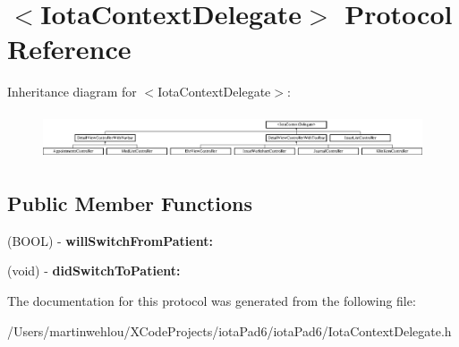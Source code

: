 \hypertarget{protocol_iota_context_delegate-p}{
\section{$<$IotaContextDelegate$>$ Protocol Reference}
\label{protocol_iota_context_delegate-p}
}
Inheritance diagram for $<$IotaContextDelegate$>$:\begin{figure}[H]
\begin{center}
\leavevmode
\includegraphics[height=1.379310cm]{protocol_iota_context_delegate-p}
\end{center}
\end{figure}
\subsection*{Public Member Functions}
\begin{DoxyCompactItemize}
\item 
\hypertarget{protocol_iota_context_delegate-p_aefd9a8b1475a15d5ed57cf7112e99065}{
(BOOL) -\/ {\bfseries willSwitchFromPatient:}}
\label{protocol_iota_context_delegate-p_aefd9a8b1475a15d5ed57cf7112e99065}

\item 
\hypertarget{protocol_iota_context_delegate-p_a34751cb7a7eda4b6ce6c59f4b6693c18}{
(void) -\/ {\bfseries didSwitchToPatient:}}
\label{protocol_iota_context_delegate-p_a34751cb7a7eda4b6ce6c59f4b6693c18}

\end{DoxyCompactItemize}


The documentation for this protocol was generated from the following file:\begin{DoxyCompactItemize}
\item 
/Users/martinwehlou/XCodeProjects/iotaPad6/iotaPad6/IotaContextDelegate.h\end{DoxyCompactItemize}
